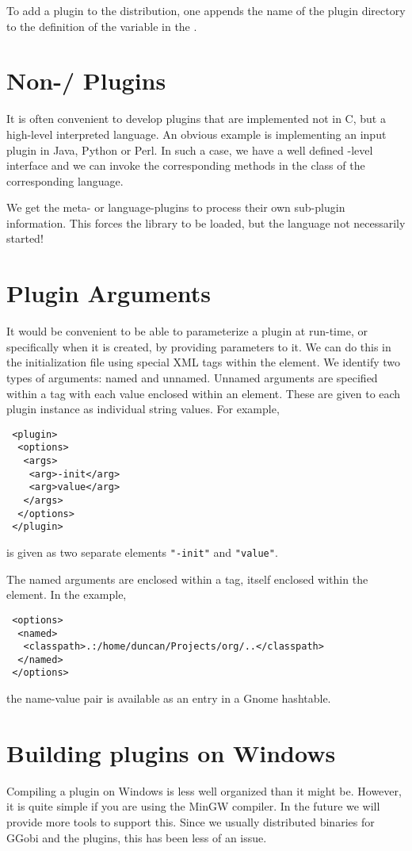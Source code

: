 \documentclass{article}
\def\file#1{\href{#1}{\Escape{#1}}}
\begin{document}
To add a plugin to the distribution, one appends the name of the
plugin directory to the definition of the variable
 in the \file{Install/GNUmakefile.admin}.


\section{Non-\C/\Cplus{} Plugins}

It is often convenient to develop plugins that are implemented not in
C, but a high-level interpreted language.  An obvious example is
implementing an input plugin in Java, Python or Perl.  In such a
case, we have a well defined \C-level interface and we can invoke the
corresponding methods in the class of the corresponding language.

We get the meta- or language-plugins to process their own sub-plugin
information. This forces the library to be loaded, but the 
language not necessarily started!

\section{Plugin Arguments}
It would be convenient to be able to parameterize a plugin at
run-time, or specifically when it is created, by providing parameters
to it.  We can do this in the initialization file using special XML
tags within the  element.  We identify two types of
arguments: named and unnamed.  Unnamed arguments are specified within
a  tag with each value enclosed within an 
element.  These are given to each plugin instance as
individual string values.
For example,
\begin{verbatim}
 <plugin>
  <options>
   <args>
    <arg>-init</arg>
    <arg>value</arg>
   </args>
  </options>
 </plugin>
\end{verbatim}
is given as two separate elements
\texttt{"-init"} and \texttt{"value"}.

The named arguments are enclosed within a  tag, itself
enclosed within the  element.
In the example,
\begin{verbatim}
 <options>
  <named>
   <classpath>.:/home/duncan/Projects/org/..</classpath>
  </named>
 </options>
\end{verbatim}
the name-value pair is available as an entry in
a Gnome hashtable.



\section{Building plugins on Windows}
Compiling a plugin on Windows is less well organized than it might be.
However, it is quite simple if you are using the MinGW compiler.  In
the future we will provide more tools to support this. Since we
usually distributed binaries for GGobi and the plugins, this has
been less of an issue.
\end{document}
